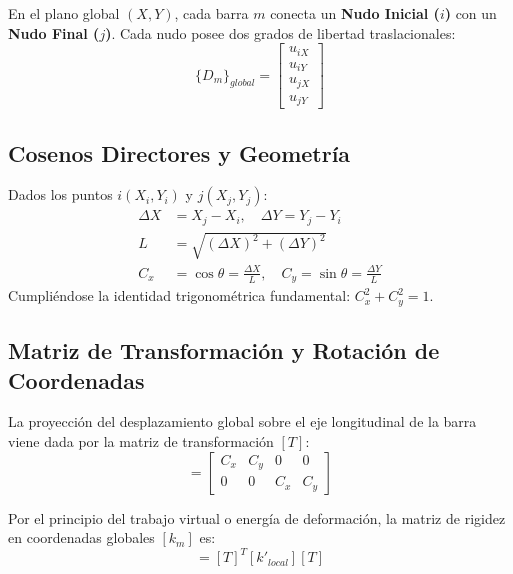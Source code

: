 \documentclass[11pt,a4paper]{article}
\begin{document}
En el plano global $(X, Y)$, cada barra $m$ conecta un \textbf{Nudo Inicial ($i$)} con un \textbf{Nudo Final ($j$)}. Cada nudo posee dos grados de libertad traslacionales:
\begin{equation}
    \{D_m\}_{global} = \begin{bmatrix} u_{iX} \\ u_{iY} \\ u_{jX} \\ u_{jY} \end{bmatrix}
\end{equation}

\subsection{Cosenos Directores y Geometría}
Dados los puntos $i(X_i, Y_i)$ y $j(X_j, Y_j)$:
\begin{align}
    \Delta X &= X_j - X_i, \quad \Delta Y = Y_j - Y_i \\
    L &= \sqrt{(\Delta X)^2 + (\Delta Y)^2} \\
    C_x &= \cos\theta = \frac{\Delta X}{L}, \quad C_y = \sin\theta = \frac{\Delta Y}{L}
\end{align}
Cumpliéndose la identidad trigonométrica fundamental: $C_x^2 + C_y^2 = 1$.

\subsection{Matriz de Transformación y Rotación de Coordenadas}
La proyección del desplazamiento global sobre el eje longitudinal de la barra viene dada por la matriz de transformación $[T]$:
\begin{equation}
    [T] = \begin{bmatrix} C_x & C_y & 0 & 0 \\ 0 & 0 & C_x & C_y \end{bmatrix}
\end{equation}

Por el principio del trabajo virtual o energía de deformación, la matriz de rigidez en coordenadas globales $[k_m]$ es:
\begin{equation}
    [k_m] = [T]^T [k'_{local}] [T]
\end{equation}
\end{document}
